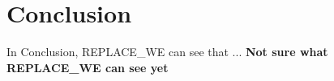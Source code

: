 \chapter{Conclusion}
\label{sec:conclusion}

In Conclusion, REPLACE_WE can see that ... \textbf{Not sure what REPLACE_WE can see yet}


